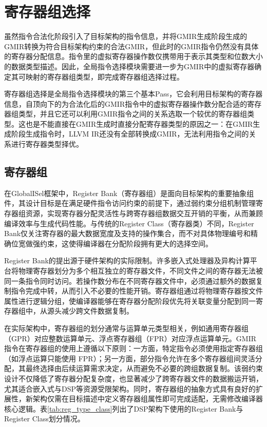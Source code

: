 \section{寄存器组选择}
虽然指令合法化阶段引入了目标架构的指令信息，并将GMIR生成阶段生成的GMIR转换为符合目标架构约束的合法GMIR，但此时的GMIR指令仍然没有具体的寄存器分配信息。指令里的虚拟寄存器操作数仅携带用于表示其类型和位数大小的数据类型描述。因此，全局指令选择模块需要进一步为GMIR中的虚拟寄存器确定其可映射的寄存器组类型，即完成寄存器组选择过程。

\par

寄存器组选择是全局指令选择模块的第三个基本Pass，它会利用目标架构的寄存器信息，自顶向下的为合法化后的GMIR指令中的虚拟寄存器操作数分配合适的寄存器组类型，并且它还可以利用GMIR指令之间的关系选取一个较优的寄存器组类型。这也是不能直接在GMIR生成时直接分配寄存器类型的原因之一：在GMIR生成阶段生成指令时，LLVM IR还没有全部转换成GMIR，无法利用指令之间的关系进行寄存器类型择优。


\subsection{寄存器组}
在GlobalISel框架中，Register Bank（寄存器组）是面向目标架构的重要抽象组件，其设计目标是在满足硬件指令访问约束的前提下，通过弱约束分组机制管理寄存器组资源，实现寄存器分配灵活性与跨寄存器组数据交互开销的平衡，从而兼顾编译效率与生成代码性能。与传统的Register Class（寄存器类）不同，Register Bank仅关注寄存器的最大数据宽度及支持的操作集合，而不对具体物理编号和精确位宽做强约束，这使得编译器在分配阶段拥有更大的选择空间。

\par

Register Bank的提出源于硬件架构的实际限制。许多嵌入式处理器及异构计算平台将物理寄存器划分为多个相互独立的寄存器文件，不同文件之间的寄存器无法被同一条指令同时访问。若操作数分布在不同寄存器文件中，必须通过额外的数据复制指令完成中转，从而引入不必要的性能开销。寄存器组通过将物理寄存器按文件属性进行逻辑分组，使编译器能够在寄存器分配阶段优先将关联变量分配到同一寄存器组中，从源头减少跨文件数据复制。

\par

在实际架构中，寄存器组的划分通常与运算单元类型相关，例如通用寄存器组（GPR）对应整数运算单元、浮点寄存器组（FPR）对应浮点运算单元。GMIR指令在寄存器组的使用上遵循以下原则：一方面，特定指令必须使用指定寄存器组（如浮点运算只能使用 FPR）；另一方面，部分指令允许在多个寄存器组间灵活分配，其最终选择由后续运算需求决定，从而避免不必要的跨组数据复制。该弱约束设计不仅降低了寄存器分配复杂度，也显著减少了跨寄存器文件的数据搬运开销，尤其适合嵌入式与DSP等资源受限架构。同时，寄存器组的抽象方式具有良好的扩展性，新架构仅需在目标描述中定义寄存器组属性即可完成适配，无需修改编译器核心逻辑。表\ref{tab:reg_type_class}列出了DSP架构下使用的Register Bank与Register Class划分情况。

